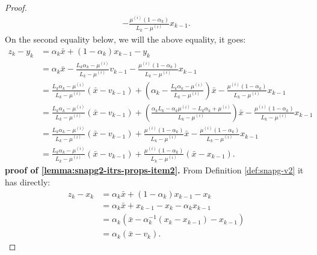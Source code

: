 \documentclass[12pt]{article}
\begin{document}
\begin{proof}
\begin{align*}
                - \frac{\mu^{(i)}(1 - \alpha_k)}{L_k - \mu^{(i)}} x_{k - 1}. 
            \end{align*}
            On the second equality below, we will the above equality, it goes: 
            \begin{align*}
                z_k - y_k &= 
                \alpha_k \bar x + (1 - \alpha_k)x_{k - 1} - y_k
                \\
                &= \alpha_k \bar x 
                - \frac{L_k\alpha_k - \mu^{(i)}}{L_k - \mu^{(i)}} v_{k - 1} 
                - \frac{\mu^{(i)}(1 - \alpha_k)}{L_k - \mu^{(i)}} x_{k - 1}
                \\
                &= \frac{L_k\alpha_k - \mu^{(i)}}{L_k - \mu^{(i)}}(\bar x - v_{k - 1})
                + \left(
                    \alpha_k - \frac{L_k\alpha_k - \mu^{(i)}}{L_k - \mu^{(i)}}
                \right)\bar x
                - \frac{\mu^{(i)}(1 - \alpha_k)}{L_k - \mu^{(i)}} x_{k - 1}
                \\
                &= \frac{L_k\alpha_k - \mu^{(i)}}{L_k - \mu^{(i)}}(\bar x - v_{k - 1})
                + \left(
                    \frac{\alpha_kL_k - \alpha_k \mu^{(i)} - L_k\alpha_k + \mu^{(i)}}{L_k - \mu^{(i)}}
                \right)\bar x
                - \frac{\mu^{(i)}(1 - \alpha_k)}{L_k - \mu^{(i)}} x_{k - 1}
                \\
                &= \frac{L_k\alpha_k - \mu^{(i)}}{L_k - \mu^{(i)}}(\bar x - v_{k - 1})
                + \frac{\mu^{(i)}(1 - \alpha_k)}{L_k - \mu^{(i)}}\bar x
                - \frac{\mu^{(i)}(1 - \alpha_k)}{L_k - \mu^{(i)}} x_{k - 1}
                \\
                &= \frac{L_k\alpha_k - \mu^{(i)}}{L_k - \mu^{(i)}}(\bar x - v_{k - 1})
                + \frac{\mu^{(i)}(1 - \alpha_k)}{L_k - \mu^{(i)}}(\bar x - x_{k - 1}).
            \end{align*}
            \textbf{proof of \ref{lemma:snapg2-itrs-props-item2}.}
            From Definition \ref{def:snapg-v2} it has directly: 
            \begin{align*}
                z_k - x_k &= \alpha_k \bar x + (1 - \alpha_k)x_{k - 1} - x_k
                \\
                &= \alpha_k \bar x + x_{k - 1} - x_k - \alpha_k x_{k - 1}
                \\
                &= \alpha_k(\bar x - \alpha_k^{-1}(x_k - x_{k - 1}) - x_{k - 1})
                \\
                &= \alpha_k (\bar x - v_k).
            \end{align*}

        \end{proof}
\end{document}
